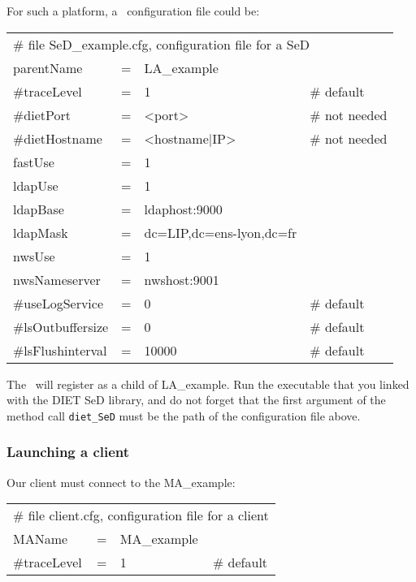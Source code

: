 For such a platform, a \sed\ configuration file could be:
\tt
\begin{center}
 \footnotesize
 \begin{tabular}{lcll}
  \multicolumn{4}{l}{\# file SeD\_example.cfg, configuration file for a SeD}\\
  parentName   &=&LA\_example        &\\
  \#traceLevel &=&1                 &\# default\\
  \#dietPort    &=&<port>             &\# not needed\\
  \#dietHostname&=&<hostname|IP>      &\# not needed\\
  fastUse    &=&1                 &\\
  ldapUse    &=&1                 &\\
  ldapBase     &=&ldaphost:9000     &\\
  ldapMask     &=&dc=LIP,dc=ens-lyon,dc=fr&\\
  nwsUse     &=&1                 &\\
  nwsNameserver&=&nwshost:9001      &\\
  \#useLogService &=& 0               &\# default\\
  \#lsOutbuffersize &=& 0             &\# default\\
  \#lsFlushinterval &=& 10000           &\# default\\
 \end{tabular}
\end{center}
\rm

The \sed\ will register as a child of LA\_example. Run the executable
that you linked with the DIET SeD library, and do not forget that the
first argument of the method call \texttt{diet\_SeD} must be the path of the
configuration file above.


\subsubsection{Launching a client}

Our client must connect to the MA\_example:
\tt
\begin{center}
 \footnotesize
 \begin{tabular}{lcll}
  \multicolumn{4}{l}{\# file client.cfg, configuration file for a client}\\
  MAName       &=&MA\_example        &\\
  \#traceLevel &=&1                 &\# default\\
 \end{tabular}
\end{center}
\rm

